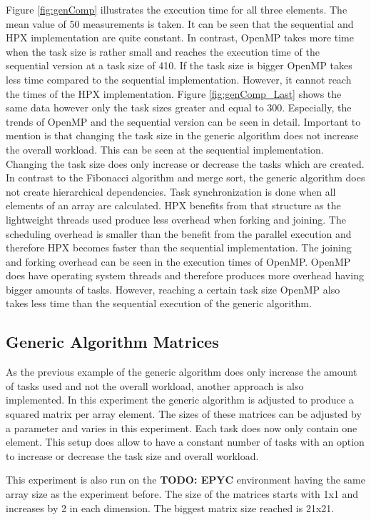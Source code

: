 Figure \ref{fig:genComp} illustrates the execution time for all three elements.
The mean value of 50 measurements is taken.
It can be seen that the sequential and HPX implementation are quite constant.
In contrast, OpenMP takes more time when the task size is rather small and reaches the execution time of the sequential version at a task size of 410.
If the task size is bigger OpenMP takes less time compared to the sequential implementation.
However, it cannot reach the times of the HPX implementation.
Figure \ref{fig:genComp_Last} shows the same data however only the task sizes greater and equal to 300.
Especially, the trends of OpenMP and the sequential version can be seen in detail.
Important to mention is that changing the task size in the generic algorithm does not increase the overall workload.
This can be seen at the sequential implementation.
Changing the task size does only increase or decrease the tasks which are created.
In contrast to the Fibonacci algorithm and merge sort, the generic algorithm does not create hierarchical dependencies.
Task synchronization is done when all elements of an array are calculated.
HPX benefits from that structure as the lightweight threads used produce less overhead when forking and joining.
The scheduling overhead is smaller than the benefit from the parallel execution and therefore HPX becomes faster than the sequential implementation.
The joining and forking overhead can be seen in the execution times of OpenMP.
OpenMP does have operating system threads and therefore produces more overhead having bigger amounts of tasks.
However, reaching a certain task size OpenMP also takes less time than the sequential execution of the generic algorithm.


\subsection{Generic Algorithm Matrices}
As the previous example of the generic algorithm does only increase the amount of tasks used and not the overall workload, another approach is also implemented.
In this experiment the generic algorithm is adjusted to produce a squared matrix per array element.
The sizes of these matrices can be adjusted by a parameter and varies in this experiment.
Each task does now only contain one element.
This setup does allow to have a constant number of tasks with an option to increase or decrease the task size and overall workload.


This experiment is also run on the \textbf{TODO: EPYC} environment having the same array size as the experiment before.
The size of the matrices starts with 1x1 and increases by 2 in each dimension.
The biggest matrix size reached is 21x21.

 

